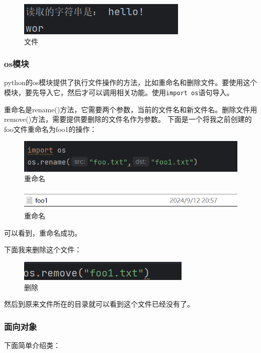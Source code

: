 \documentclass{ctexart}
\begin{document}
	\begin{figure}[H]
		\centering
		\includegraphics[scale=0.5]{3.68}
		\caption{文件}
	\end{figure}
	
	
	
	
	\subsubsection{os模块}
	
	python的os模块提供了执行文件操作的方法，比如重命名和删除文件。要使用这个模块，要先导入它，然后才可以调用相关功能。使用\verb|import os|语句导入。
	
	重命名是rename()方法，它需要两个参数，当前的文件名和新文件名。删除文件用remove()方法，需要提供要删除的文件名作为参数。
	下面是一个将我之前创建的foo文件重命名为foo1的操作：
	\begin{figure}[H]
		\centering
		\includegraphics[scale=0.5]{3.69}
		\caption{重命名}
	\end{figure}
	
	\begin{figure}[H]
		\centering
		\includegraphics[scale=0.5]{3.70}
		\caption{重命名}
	\end{figure}
	
	可以看到，重命名成功。
	
	下面我来删除这个文件：
	\begin{figure}[H]
		\centering
		\includegraphics[scale=0.5]{3.71}
		\caption{删除}
	\end{figure}
	然后到原来文件所在的目录就可以看到这个文件已经没有了。
	
	\subsubsection{面向对象}
	下面简单介绍类：
	
\end{document}
